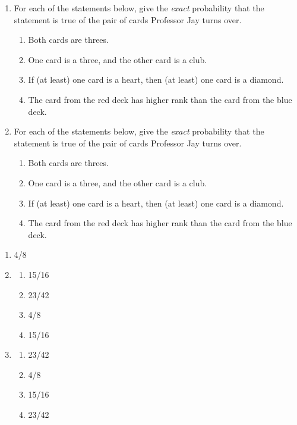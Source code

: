 \documentclass[11pt]{article}
\begin{document}
\begin{enumerate}
\begin{enumerate}
\item
For each of the statements below, give the \emph{exact} probability that the statement is true of the  pair of cards Professor Jay turns over.
\begin{enumerate}
\item
Both cards are threes.
\item
One card is a three, and the other card is a club.
\item
If (at least) one card is a heart, then (at least) one card is a diamond.
\item
The card from the red deck has higher rank than the card from the blue deck.
\end{enumerate}

\item
For each of the statements below, give the \emph{exact} probability that the statement is true of the  pair of cards Professor Jay turns over.
\begin{enumerate}
\item
Both cards are threes.
\item
One card is a three, and the other card is a club.
\item
If (at least) one card is a heart, then (at least) one card is a diamond.
\item
The card from the red deck has higher rank than the card from the blue deck.
\end{enumerate}
\end{enumerate}

\begin{solution}
\begin{enumerate}
\item 4/8

\item
\begin{enumerate}
\item 15/16
\item 23/42
\item 4/8
\item 15/16
\end{enumerate}

\item
\begin{enumerate}
\item 23/42
\item 4/8
\item 15/16
\item 23/42
\end{enumerate}
\end{enumerate}
\end{solution}



\end{enumerate}
\end{document}
